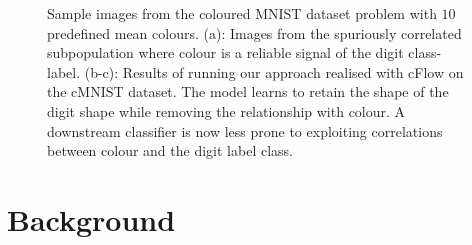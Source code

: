 \begin{figure}[!htb]
{        \label{fig:cflow_cmnist_y}
    }
    \hfill
    \caption{
        Sample images from the coloured MNIST dataset problem with $10$ predefined mean colours.
        (a): Images from the spuriously correlated subpopulation where colour is a reliable signal of the digit class-label.
        (b-c): Results of running our approach realised with cFlow on the cMNIST dataset.
        The model learns to retain the shape of the digit shape while removing the relationship with colour.
        A downstream classifier is now less prone to exploiting correlations between colour and the digit label class.
    }\label{fig:cmnist}
\end{figure}


\section{Background}\label{sec:background}

